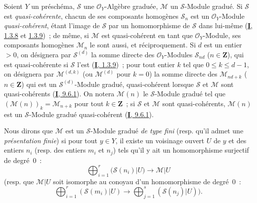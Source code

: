 \begin{env}[3.1.1]
\label{II.3.1.1-fr}
Soient $Y$ un préschéma, $\mathcal{S}$ une $\mathcal{O}_Y$-Algèbre graduée,
$\mathcal{M}$ un $\mathcal{S}$-Module gradué. Si $\mathcal{S}$ est
\emph{quasi-cohérente}, chacun de ses composants homogènes $\mathcal{S}_n$ est
un $\mathcal{O}_Y$-Module \emph{quasi-cohérent}, étant l'image de
$\mathcal{S}$ par un homomorphisme de $\mathcal{S}$ dans lui-même
(\hyperref[I.1.3.8-fr]{\textbf{I}, 1.3.8} et
\hyperref[I.1.3.9-fr]{1.3.9})~; de même, si $\mathcal{M}$ est
quasi-cohérent en tant que $\mathcal{O}_Y$-Module, ses composants homogènes
$\mathcal{M}_n$ le sont aussi, et réciproquement. Si $d$ est un entier $>0$,
on désignera par $\mathcal{S}^{(d)}$ la somme directe des
$\mathcal{O}_Y$-Modules $\mathcal{S}_{nd}$ ($n\in\mathbf{Z}$), qui est
quasi-cohérente si $\mathcal{S}$ l'est
(\hyperref[I.1.3.9-fr]{\textbf{I}, 1.3.9})~; pour tout entier $k$ tel que
$0\leq k\leq d-1$, on désignera par $\mathcal{M}^{(d,k)}$ (ou
$\mathcal{M}^{(d)}$ pour $k=0$) la somme directe des
$\mathcal{M}_{nd+k}$ ($n\in\mathbf{Z}$) qui est un
$\mathcal{S}^{(d)}$-Module gradué, quasi-cohérent lorsque $\mathcal{S}$ et
$\mathcal{M}$ sont quasi-cohérents (\hyperref[I.9.6.1-fr]{\textbf{I}, 9.6.1}). On
notera $\mathcal{M}(n)$ le $\mathcal{S}$-Module gradué tel que
$(\mathcal{M}(n))_k=\mathcal{M}_{n+k}$ pour tout $k\in\mathbf{Z}$~; si
$\mathcal{S}$ et $\mathcal{M}$ sont quasi-cohérents, $\mathcal{M}(n)$ est un
$\mathcal{S}$-Module gradué quasi-cohérent
(\hyperref[I.9.6.1-fr]{\textbf{I}, 9.6.1}).

Nous dirons que $\mathcal{M}$ est un $\mathcal{S}$-Module gradué
\emph{de type fini} (resp. qu'il admet une \emph{présentation finie}) si pour
tout $y\in Y$, il existe un voisinage ouvert $U$ de $y$ et des entiers $n_i$
(resp. des entiers $m_i$ et $n_j$) tels qu'il y ait un homomorphisme surjectif
de degré~$0$~:
\[
  \bigoplus_{i=1}^r(\mathcal{S}(n_i)|U)\longrightarrow\mathcal{M}|U
\]
(resp. que $\mathcal{M}|U$ soit isomorphe au conoyau d'un homomorphisme de
degré~$0$~:
\[
  \bigoplus_{i=1}^r(\mathcal{S}(m_i)|U)
  \longrightarrow\bigoplus_{j=1}^s(\mathcal{S}(n_j)|U)).
\]


\end{env}
